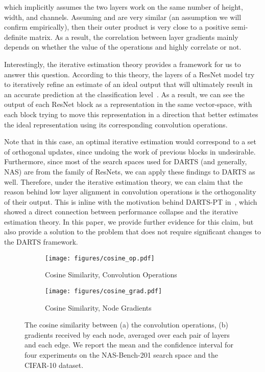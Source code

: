 \documentclass{article} \usepackage{fancyhdr, iclr2023_conference, times}
\newcommand{\lambdafn}{layer alignment\xspace}
\begin{document}
which implicitly assumes the two layers work on the same number of height, width, and channels. Assuming  and  are very similar (an assumption we will confirm empirically), then their outer product is very close to a positive semi-definite matrix. As a result, the correlation between layer gradients mainly depends on whether the value of the operations  and  highly correlate or not. 
\par Interestingly, the iterative estimation theory provides a framework for us to answer this question. According to this theory, the layers of a ResNet model try to iteratively refine an estimate of an ideal output that will ultimately result in an accurate prediction at the classification level~\citep{DBLP:conf/iclr/GreffSS17, DBLP:conf/iclr/JastrzebskiABVC18}. As a result, we can see the output of each ResNet block as a representation in the same vector-space, with each block trying to move this representation in a direction that better estimates the ideal representation using its corresponding convolution operations.
\par Note that in this case, an optimal iterative estimation would correspond to a set of orthogonal updates, since undoing the work of previous blocks in undesirable. Furthermore, since most of the search spaces used for DARTS (and generally, NAS) are from the family of ResNets, we can apply these findings to DARTS as well. Therefore, under the iterative estimation theory, we can claim that the reason behind low \lambdafn in convolution operations is the orthogonality of their output. This is inline with the motivation behind DARTS-PT in~\citep{DBLP:conf/iclr/WangCCTH21}, which showed a direct connection between performance collapse and the iterative estimation theory. In this paper, we provide further evidence for this claim, but also provide a solution to the problem that does not require significant changes to the DARTS framework.
\begin{figure}[h]
    \centering
    \begin{subfigure}[h]{0.5\textwidth}
        \centering
        \texttt{[image: figures/cosine\_op.pdf]}
        \caption{Cosine Similarity, Convolution Operations}
    \end{subfigure}\begin{subfigure}[h]{0.5\textwidth}
        \centering
        \texttt{[image: figures/cosine\_grad.pdf]}
        \caption{Cosine Similarity, Node Gradients}
    \end{subfigure}
    \caption{The cosine similarity between (a) the convolution operations, (b) gradients received by each node, averaged over each pair of layers and each edge. We report the mean and the  confidence interval for four experiments on the NAS-Bench-201 search space and the CIFAR-10 dataset.}
    \label{fig:cosine-sim}
\end{figure}
\end{document}
